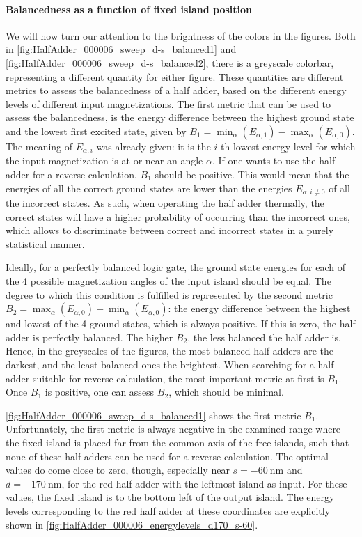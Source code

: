 \documentclass[11pt,a4paper,english,twoside]{article}
\begin{document}
\paragraph{Balancedness as a function of fixed island position}
We will now turn our attention to the brightness of the colors in the figures. Both in \cref{fig:HalfAdder_000006_sweep_d-s_balanced1} and \cref{fig:HalfAdder_000006_sweep_d-s_balanced2}, there is a greyscale colorbar, representing a different quantity for either figure. These quantities are different metrics to assess the balancedness of a half adder, based on the different energy levels of different input magnetizations. The first metric that can be used to assess the balancedness, is the energy difference between the highest ground state and the lowest first excited state, given by $B_1 = \min_\alpha(E_{\alpha,1}) - \max_\alpha(E_{\alpha,0})$. The meaning of $E_{\alpha,i}$ was already given: it is the $i$-th lowest energy level for which the input magnetization is at or near an angle $\alpha$. If one wants to use the half adder for a reverse calculation, $B_1$ should be positive. This would mean that the energies of all the correct ground states are lower than the energies $E_{\alpha,i\neq 0}$ of all the incorrect states. As such, when operating the half adder thermally, the correct states will have a higher probability of occurring than the incorrect ones, which allows to discriminate between correct and incorrect states in a purely statistical manner. \par
Ideally, for a perfectly balanced logic gate, the ground state energies for each of the 4 possible magnetization angles of the input island should be equal. The degree to which this condition is fulfilled is represented by the second metric $B_2 = \max_\alpha(E_{\alpha,0}) - \min_\alpha(E_{\alpha,0})$: the energy difference between the highest and lowest of the 4 ground states, which is always positive. If this is zero, the half adder is perfectly balanced. The higher $B_2$, the less balanced the half adder is.
Hence, in the greyscales of the figures, the most balanced half adders are the darkest, and the least balanced ones the brightest. When searching for a half adder suitable for reverse calculation, the most important metric at first is $B_1$. Once $B_1$ is positive, one can assess $B_2$, which should be minimal. \par
\cref{fig:HalfAdder_000006_sweep_d-s_balanced1} shows the first metric $B_1$. Unfortunately, the first metric is always negative in the examined range where the fixed island is placed far from the common axis of the free islands, such that none of these half adders can be used for a reverse calculation. The optimal values do come close to zero, though, especially near $s=\SI{-60}{\nano\metre}$ and $d=\SI{-170}{\nano\metre}$, for the red half adder with the leftmost island as input. For these values, the fixed island is to the bottom left of the output island. The energy levels corresponding to the red half adder at these coordinates are explicitly shown in \cref{fig:HalfAdder_000006_energylevels_d170_s-60}.
\end{document}
